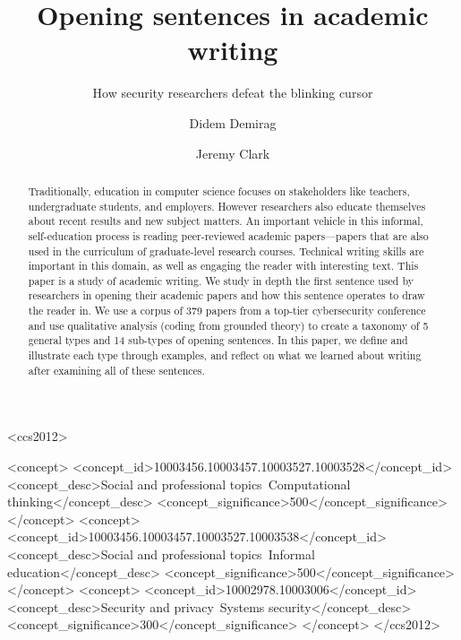 \documentclass[sigconf,anonymous]{acmart}
\begin{document}
\title{Opening sentences in academic writing}
\subtitle{How security researchers defeat the blinking cursor}

\author{Didem Demirag}
\author{Jeremy Clark}

\begin{abstract}

Traditionally, education in computer science focuses on stakeholders like teachers, undergraduate students, and employers. However researchers also educate themselves about recent results and new subject matters. An important vehicle in this informal, self-education process is reading peer-reviewed academic papers---papers that are also used in the curriculum of graduate-level research courses. Technical writing skills are important in this domain, as well as engaging the reader with interesting text. This paper is a study of academic writing. We study in depth the first sentence used by researchers in opening their academic papers and how this sentence operates to draw the reader in. We use a corpus of 379 papers from a top-tier cybersecurity conference and use qualitative analysis (coding from grounded theory) to create a taxonomy of 5 general types and 14 sub-types of opening sentences. In this paper, we define and illustrate each type through examples, and reflect on what we learned about writing after examining all of these sentences.

\end{abstract}

\begin{CCSXML}
<ccs2012>

   <concept>
       <concept_id>10003456.10003457.10003527.10003528</concept_id>
       <concept_desc>Social and professional topics~Computational thinking</concept_desc>
       <concept_significance>500</concept_significance>
       </concept>
       <concept>
<concept_id>10003456.10003457.10003527.10003538</concept_id>
<concept_desc>Social and professional topics~Informal education</concept_desc>
<concept_significance>500</concept_significance>
</concept>
   <concept>
       <concept_id>10002978.10003006</concept_id>
       <concept_desc>Security and privacy~Systems security</concept_desc>
       <concept_significance>300</concept_significance>
       </concept>
 </ccs2012>
\end{CCSXML}
\end{document}
